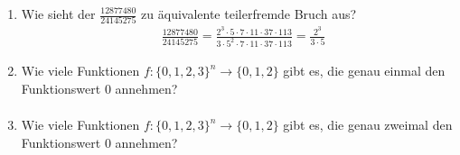 \begin{enumerate}[label=(\alph*)]
		\item Wie sieht der $\frac{12877480}{24145275}$ zu äquivalente teilerfremde Bruch aus?
		\begin{align*}
			& \frac{12877480}{24145275} = \frac{2^3 \cdot 5 \cdot 7 \cdot 11 \cdot 37 \cdot 113}
			{3 \cdot 5^2 \cdot 7 \cdot 11 \cdot 37 \cdot 113} = \frac{2^3}{3 \cdot 5}
		\end{align*}

		\item Wie viele Funktionen $f : \{0, 1, 2, 3\}^n \to \{0, 1, 2\}$ gibt es, die genau einmal den Funktionswert 0 annehmen?
		\begin{align*}
		\end{align*}

		\item Wie viele Funktionen $f : \{0, 1, 2, 3\}^n \to \{0, 1, 2\}$ gibt es, die genau zweimal den Funktionswert 0 annehmen?
		\begin{align*}
		\end{align*}
		
	\end{enumerate} 
	
